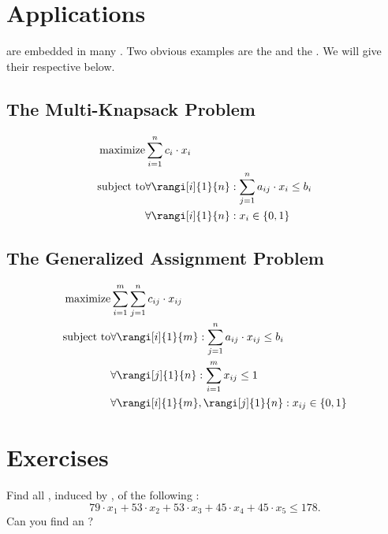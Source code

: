 \section{Applications}

 are embedded in many . Two obvious examples are the  and the . We will give their respective  below.

\subsection{The Multi-Knapsack Problem}

\begin{eqnarray}
\mbox{maximize}&\sumieqb[i]{1}{n}{c_i\cdot x_i}\\
\mbox{subject to}&\forall\rangi[i]{1}{n}:\sumieqb[j]{1}{n}{a_{ij}\cdot x_i}\leq b_i\\
&\forall\rangi[i]{1}{n}:x_i\in\accl{0,1}
\end{eqnarray}

\subsection{The Generalized Assignment Problem}

\begin{eqnarray}
\mbox{maximize}&\sumieqb[i]{1}{m}{\sumieqb[j]{1}{n}{c_{ij}\cdot x_{ij}}}\\
\mbox{subject to}&\forall\rangi[i]{1}{m}:\sumieqb[j]{1}{n}{a_{ij}\cdot x_{ij}}\leq b_i\\
&\forall\rangi[j]{1}{n}:\sumieqb[i]{1}{m}x_{ij}\leq 1\\
&\forall\rangi[i]{1}{m},\rangi[j]{1}{n}:x_{ij}\in\accl{0,1}
\end{eqnarray}

\section*{Exercises}
\begin{exercise}
Find all , induced by , of the following :
\begin{equation}
79\cdot x_1+53\cdot x_2+53\cdot x_3+45\cdot x_4+45\cdot x_5\leq178.
\end{equation}
Can you find an ?
\end{exercise}

